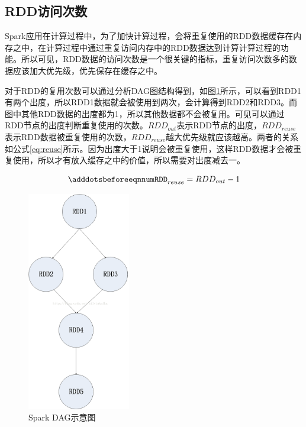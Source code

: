 \subsection{RDD访问次数}

Spark应用在计算过程中，为了加快计算过程，会将重复使用的RDD数据缓存在内存之中，在计算过程中通过重复访问内存中的RDD数据达到计算计算过程的功能。所以可见，RDD数据的访问次数是一个很关键的指标，重复访问次数多的数据应该加大优先级，优先保存在缓存之中。

对于RDD的复用次数可以通过分析DAG图结构得到，如图\ref{fig:spark-dag}所示，可以看到RDD1有两个出度，所以RDD1数据就会被使用到两次，会计算得到RDD2和RDD3。而图中其他RDD数据的出度都为1，所以其他数据都不会被复用。可见可以通过RDD节点的出度判断重复使用的次数。$RDD_{out}$表示RDD节点的出度，$RDD_{reuse}$表示RDD数据被重复使用的次数，$RDD_{reuse}$越大优先级就应该越高。两者的关系如公式\eqref{eq:reuse}所示。因为出度大于1说明会被重复使用，这样RDD数据才会被重复使用，所以才有放入缓存之中的价值，所以需要对出度减去一。

\begin{equation} \label{eq:reuse}
    \adddotsbeforeeqnnum%
    RDD_{reuse} = RDD_{out} - 1
\end{equation}

\begin{figure}[htbp]
    \centering
    \includegraphics[width=0.4\textwidth]{Img/spark-dag.png}
    \caption{Spark DAG示意图}
    \label{fig:spark-dag}
\end{figure}

